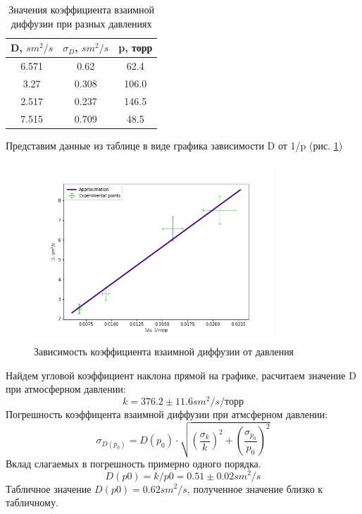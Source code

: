\documentclass[a4paper,12pt]{article} %
\begin{document}
\begin{table} \label{D} \caption{Значения коэффициента взаимной диффузии при разных давлениях} \begin{tabular}{|c|c|c|} \hline D, $sm^2/s$&	$\sigma_D$, $sm^2/s$ & p, торр \\ \hline 6.571 & 0.62 & 62.4 \\ \hline 3.27 & 0.308 & 106.0 \\ \hline 2.517 & 0.237 & 146.5 \\ \hline 7.515 & 0.709 & 48.5 \\ \hline \end{tabular} \end{table}
Представим данные из таблице в виде графика зависимости D от 1/p (рис. \ref{D_p})

\begin{figure}[h!]
\begin{center}
\includegraphics[width=0.8\textwidth]{D(p)}
\end{center}
\caption{Зависимость коэффициента взаимной диффузии от давления} \label{D_p}
\end{figure}

Найдем угловой коэффициент наклона прямой на графике, расчитаем значение D при атмосферном давлении:
\begin{equation}
k = 376.2 \pm 11.6 sm^2/s/\text{торр}
\end{equation}
Погрешность коэффицента взаимной диффузии при атмсферном давлении:
\begin{equation}
\sigma_{D(p_0)}=D(p_0)\cdot \sqrt{(\frac{\sigma_k}{k})^2
+(\frac{\sigma_{p_0}}{p_0})^2}
\end{equation}
Вклад слагаемых в погрешность примерно одного порядка.
\begin{equation}
D(p0)=k/p0=0.51 \pm 0.02 sm^2/s
\end{equation} 
Табличное значение $D(p0) = 0.62 sm^2/s$, полученное значение близко к табличному.
\end{document}
